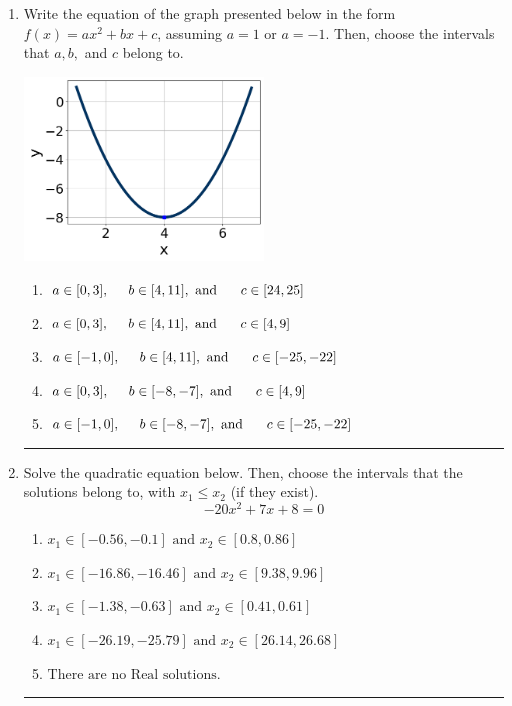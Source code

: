 \documentclass[14pt]{extbook}
\newcommand{\litem}[1]{\item#1\hspace*{-1cm}\rule{\textwidth}{0.4pt}}
\begin{document}
\begin{enumerate}
{\begin{enumerate}[label=\Alph*.]
\end{enumerate} }
\litem{
Write the equation of the graph presented below in the form $f(x)=ax^2+bx+c$, assuming  $a=1$ or $a=-1$. Then, choose the intervals that $a, b,$ and $c$ belong to.
\begin{center}
    \includegraphics[width=0.5\textwidth]{../Figures/quadraticGraphToEquationCopyA.png}
\end{center}
\begin{enumerate}[label=\Alph*.]
\item \( a \in [0, 3], \hspace*{5mm} b \in [4, 11], \text{ and } \hspace*{5mm} c \in [24, 25] \)
\item \( a \in [0, 3], \hspace*{5mm} b \in [4, 11], \text{ and } \hspace*{5mm} c \in [4, 9] \)
\item \( a \in [-1, 0], \hspace*{5mm} b \in [4, 11], \text{ and } \hspace*{5mm} c \in [-25, -22] \)
\item \( a \in [0, 3], \hspace*{5mm} b \in [-8, -7], \text{ and } \hspace*{5mm} c \in [4, 9] \)
\item \( a \in [-1, 0], \hspace*{5mm} b \in [-8, -7], \text{ and } \hspace*{5mm} c \in [-25, -22] \)

\end{enumerate} }
\litem{
Solve the quadratic equation below. Then, choose the intervals that the solutions belong to, with $x_1 \leq x_2$ (if they exist).\[ -20x^{2} +7 x + 8 = 0 \]\begin{enumerate}[label=\Alph*.]
\item \( x_1 \in [-0.56, -0.1] \text{ and } x_2 \in [0.8, 0.86] \)
\item \( x_1 \in [-16.86, -16.46] \text{ and } x_2 \in [9.38, 9.96] \)
\item \( x_1 \in [-1.38, -0.63] \text{ and } x_2 \in [0.41, 0.61] \)
\item \( x_1 \in [-26.19, -25.79] \text{ and } x_2 \in [26.14, 26.68] \)
\item \( \text{There are no Real solutions.} \)


\end{enumerate}}
\end{enumerate}
\end{document}
